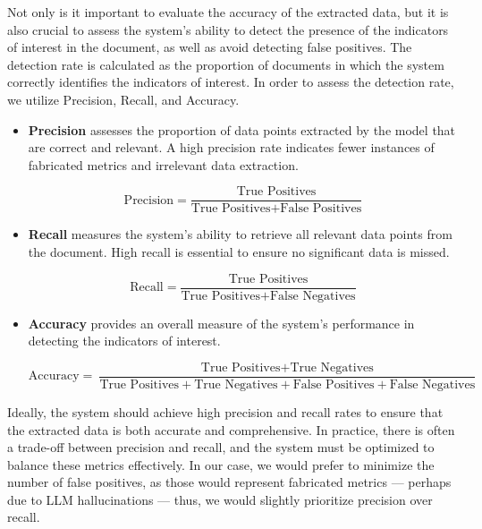 \documentclass[english, 12pt, a4paper, elec, utf8, a-2b, online]{aaltothesis}
\begin{document}
Not only is it important to evaluate the accuracy of the extracted data, but it is also crucial to assess the system's ability to detect the presence of the indicators of interest in the document, as well as avoid detecting false positives.
The detection rate is calculated as the proportion of documents in which the system correctly identifies the indicators of interest.
In order to assess the detection rate, we utilize Precision, Recall, and Accuracy.

\begin{itemize}
    \item \textbf{Precision} assesses the proportion of data points extracted by the model that are correct and relevant.
    A high precision rate indicates fewer instances of fabricated metrics and irrelevant data extraction.

    \begin{equation}
        \text{Precision} = \frac{\text{True Positives}}{\text{True Positives} + \text{False Positives}}
    \end{equation}

    \item \textbf{Recall} measures the system's ability to retrieve all relevant data points from the document.
    High recall is essential to ensure no significant data is missed.

    \begin{equation}
        \text{Recall} = \frac{\text{True Positives}}{\text{True Positives} + \text{False Negatives}}
    \end{equation}

    \item \textbf{Accuracy} provides an overall measure of the system's performance in detecting the indicators of interest.

    \begin{equation}
        \text{Accuracy} = \frac{\text{True Positives} + \text{True Negatives}}{\text{True Positives} + \text{True Negatives} + \text{False Positives} + \text{False Negatives}}
    \end{equation}
\end{itemize}

Ideally, the system should achieve high precision and recall rates to ensure that the extracted data is both accurate and comprehensive.
In practice, there is often a trade-off between precision and recall, and the system must be optimized to balance these metrics effectively.
In our case, we would prefer to minimize the number of false positives, as those would represent fabricated metrics --- perhaps due to \ac{LLM} hallucinations --- thus, we would slightly prioritize precision over recall.
\end{document}
